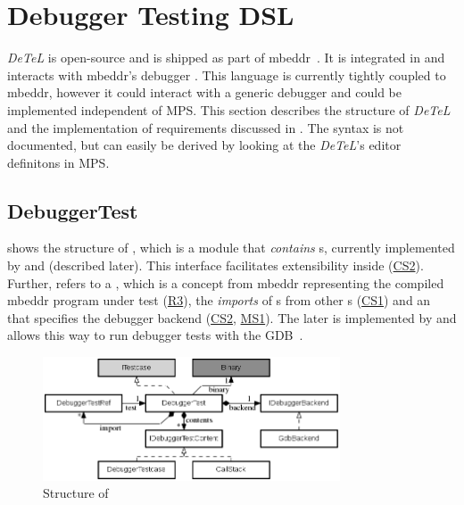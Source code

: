 \section{Debugger Testing DSL}

\emph{DeTeL} is open-source and is shipped as part of
mbeddr~\cite{mbeddrGithub}.
It is integrated in  and interacts
with mbeddr's debugger . This language is currently tightly
coupled to mbeddr, however it could interact with a generic debugger 
and could be implemented independent of \ac{MPS}.
This section describes the structure of \emph{DeTeL} and the
implementation of requirements discussed in . 
The syntax is not documented, but can easily be derived by looking at the
\emph{DeTeL}'s editor definitons in \ac{MPS}. 

\subsection{DebuggerTest}
\label{DebuggerTestSection}

 shows the structure of 
, which is a module that \emph{contains} 
s, currently implemented by 
 and  (described later). This interface
facilitates extensibility inside
 (\hyperref[CS2]{CS2}). Further,  refers to 
a , which is a concept from mbeddr representing the compiled mbeddr
program under test (\hyperref[R3]{R3}), 
the \emph{imports} of s from
other s (\hyperref[CS1]{CS1}) and an
 that specifies the debugger backend 
(\hyperref[CS2]{CS2}, \hyperref[MS1]{MS1}). The later is implemented by
 and allows this way to run debugger tests with the
\ac{GDB}~\cite{gdb}.

\vspace{1mm}
\begin{figure}[h]
  \vspace{-2mm}
  \centering
    \includegraphics[width=8.8cm]{./figures/graph2-2.png} 
    \vspace{-3mm}
    \caption{Structure of }
  \label{fig:DebuggerTestStructure}
  \vspace{-2mm}
\end{figure}

